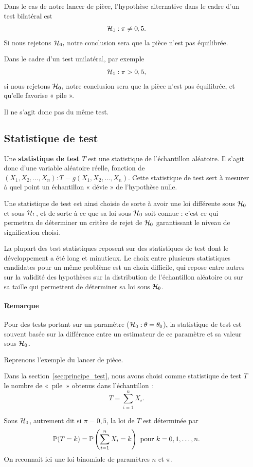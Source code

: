 \begin{exemple}
  Dans le cas de notre lancer de pièce, l'hypothèse alternative dans le cadre
  d'un test bilatéral est
  \[
    \mathcal{H}_1: \pi \neq 0,5.
  \]
  Si nous rejetons $\mathcal{H}_0,$ notre conclusion sera que la pièce n'est pas équilibrée.

  Dans le cadre d'un test unilatéral, par exemple
  \[
    \mathcal{H}_1: \pi > 0,5,
  \]
  si nous rejetons $\mathcal{H}_0,$ notre conclusion sera que la pièce n'est pas
  équilibrée, et qu'elle favorise « pile ».

  Il ne s'agit donc pas du même test.
\end{exemple}


\subsection{Statistique de test}
Une \textbf{statistique de test} $T$ est une statistique de l'échantillon
aléatoire. Il s'agit donc d'une variable aléatoire réelle, fonction de
$(X_1, X_2, \dots, X_n) : T = g(X_1, X_2, \dots, X_n)$. Cette statistique de
test sert à mesurer à quel point un échantillon « dévie » de l'hypothèse nulle.

Une statistique de test est ainsi choisie de sorte à avoir une loi différente
sous $\mathcal{H}_0$ et sous $\mathcal{H}_1$, et de sorte à ce que sa loi sous $\mathcal{H}_0$ soit
connue : c'est ce qui permettra de déterminer un critère de rejet de $\mathcal{H}_0$
garantissant le niveau de signification choisi.

La plupart des test statistiques reposent sur des statistiques de test dont le
développement a été long et minutieux. Le choix entre plusieurs statistiques
candidates pour un même problème est un choix difficile, qui repose entre
autres sur la validité des hypothèses sur la distribution de l'échantillon
aléatoire ou sur sa taille qui permettent de déterminer sa loi sous $\mathcal{H}_0$.

\paragraph{Remarque} Pour des tests portant sur un paramètre
($\mathcal{H}_0: \theta = \theta_0$), la statistique de test est souvent basée sur la
différence entre un estimateur de ce paramètre et sa valeur sous $\mathcal{H}_0$.

\begin{exemple}
  Reprenons l'exemple du lancer de pièce.

  Dans la section~\ref{sec:principe_test}, nous avons choisi comme statistique
  de test $T$ le nombre de «~pile~» obtenus dans l'échantillon :
  \[
    T = \sum_{i=1}^n X_i.
  \]

  Sous $\mathcal{H}_0$, autrement dit si $\pi=0,5$, la loi de $T$ est déterminée par 
  \[
    \mathbb{P}(T=k) = \mathbb{P}\left(\sum_{i=1}^n X_i = k\right) \text{ pour } k=0, 1,
    \dots, n.
  \]
  On reconnait ici une loi binomiale de paramètres $n$ et $\pi.$
\end{exemple}


